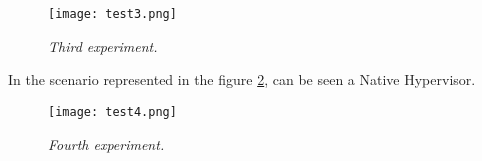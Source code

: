 \begin{figure}[!ht]
\begin{center}
\texttt{[image: test3.png]}
\caption{\small \sl Third experiment.\label{fig:test3}}
\end{center}
\end{figure}


In the scenario represented in the figure \ref{fig:test4}, can be seen a Native Hypervisor.


\begin{figure}[!ht]
\begin{center}
\texttt{[image: test4.png]}
\caption{\small \sl Fourth experiment.\label{fig:test4}}
\end{center}
\end{figure}

